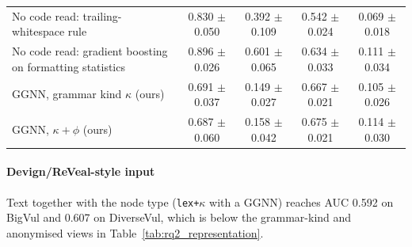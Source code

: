 \documentclass[pdflatex,sn-basic]{sn-jnl}
\theoremstyle{thmstyleone}%
\newcommand{\mBvGgnnLexKindAuc}{0.592}
\newcommand{\mDvGgnnLexKindAuc}{0.607}
\begin{document}
\begin{tableorg}[t]
{\begin{tabular}{lcccc}
No code read: trailing-whitespace rule & 0.830 $\pm$ 0.050 & 0.392 $\pm$ 0.109 & 0.542 $\pm$ 0.024 & 0.069 $\pm$ 0.018 \\
No code read: gradient boosting on formatting statistics & 0.896 $\pm$ 0.026 & 0.601 $\pm$ 0.065 & 0.634 $\pm$ 0.033 & 0.111 $\pm$ 0.034 \\
GGNN, grammar kind $\kappa$ (ours) & 0.691 $\pm$ 0.037 & 0.149 $\pm$ 0.027 & 0.667 $\pm$ 0.021 & 0.105 $\pm$ 0.026 \\
GGNN, $\kappa{+}\phi$ (ours) & 0.687 $\pm$ 0.060 & 0.158 $\pm$ 0.042 & 0.675 $\pm$ 0.021 & 0.114 $\pm$ 0.030 \\
\bottomrule
\end{tabular}}
\end{tableorg}

\paragraph{Devign/ReVeal-style input} Text together with the node type
(\texttt{lex+$\kappa$} with a GGNN) reaches AUC \mBvGgnnLexKindAuc{} on BigVul
and \mDvGgnnLexKindAuc{} on DiverseVul, which is below the grammar-kind and anonymised views in
Table~\ref{tab:rq2_representation}.
\end{document}
